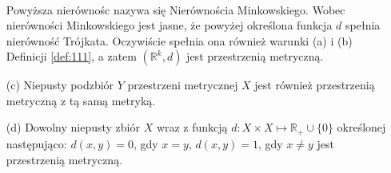 \documentclass[leqno]{article}
\begin{document}
\begin{justify}
\begin{ex}
\begin{itemize}
\begin{align*}
        \end{align*}
        Powyższa nierównośc nazywa się Nierównościa Minkowskiego. Wobec nierówności Minkowskiego jest jasne, że powyżej określona funkcja $d$ spełnia nierówność Trójkata. Oczywiście spełnia ona również warunki (a) i (b) Definicji \ref{def:111}, a zatem
        $(\mathbb{R}^k, d)$ jest przestrzenią metryczną.
        \item [(c)] Niepusty podzbiór $Y$ przestrzeni metrycznej $X$ jest również przestrzenią metryczną z tą samą metryką.
        \item [(d)] Dowolny niepusty zbiór $X$ wraz z funkcją $d : X \times X \mapsto \mathbb{R}_+ \cup \{0\}$ określonej następująco:
            $d(x, y) = 0$, gdy $x = y$, $d(x, y) = 1$, gdy $x \neq y$ jest przestrzenią metryczną.
    \end{itemize}
\end{ex}


\end{justify}
\end{document}
